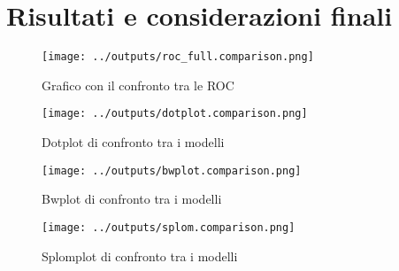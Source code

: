 \chapter{Risultati e considerazioni finali}
\begin{figure}[H]
    \centering
    \texttt{[image: ../outputs/roc\_full.comparison.png]}
    \caption{Grafico con il confronto tra le ROC}
\end{figure}
\begin{figure}[H]
    \centering
    \texttt{[image: ../outputs/dotplot.comparison.png]}
    \caption{Dotplot di confronto tra i modelli}
\end{figure}
\begin{figure}[H]
    \centering
    \texttt{[image: ../outputs/bwplot.comparison.png]}
    \caption{Bwplot di confronto tra i modelli}
\end{figure}
\begin{figure}[H]
    \centering
    \texttt{[image: ../outputs/splom.comparison.png]}
    \caption{Splomplot di confronto tra i modelli}
\end{figure}
